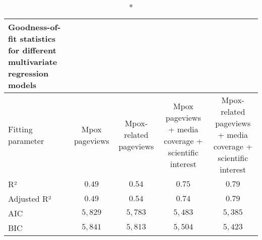 \begin{longtable}{lcccc}
\caption*{
{\large Goodness-of-fit statistics for different multivariate regression models}
} \\ 
\toprule
Fitting parameter & Mpox pageviews & Mpox-related pageviews & Mpox pageviews + media coverage + scientific interest & Mpox-related pageviews + media coverage + scientific interest \\ 
\midrule\addlinespace[2.5pt]
R² & $0.49$ & $0.54$ & $0.75$ & $0.79$ \\ 
Adjusted R² & $0.49$ & $0.54$ & $0.74$ & $0.79$ \\ 
AIC & $5,829$ & $5,783$ & $5,483$ & $5,385$ \\ 
BIC & $5,841$ & $5,813$ & $5,504$ & $5,423$ \\ 
\bottomrule
\end{longtable}

